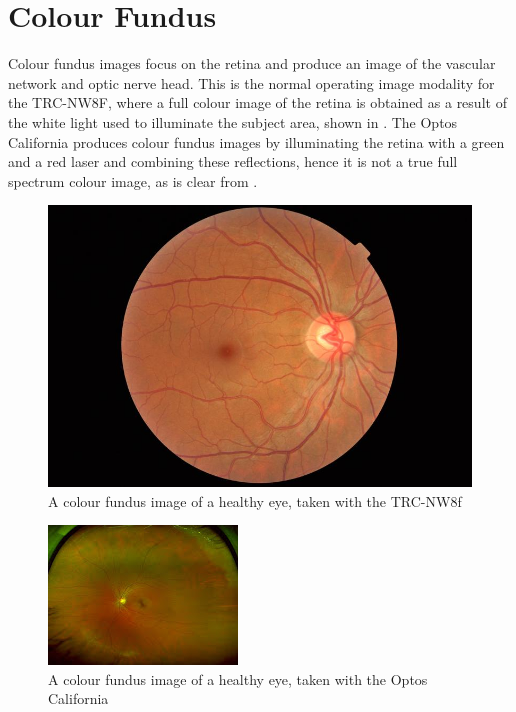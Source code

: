 \section{Colour Fundus}

Colour fundus images focus on the retina and produce an image of the vascular
network and optic nerve head. This is the normal operating image modality for
the TRC-NW8F, where a full colour image of the retina is obtained as a result
of the white light used to illuminate the subject area, shown in .
The Optos California produces colour fundus images by illuminating the retina
with a green and a red laser and combining these reflections, hence it is not
a true full spectrum colour image, as is clear from .

\begin{figure}[htbp]
\centering
\includegraphics{figures/colourtrc}
\caption{A colour fundus image of a healthy eye, taken with the TRC-NW8f}
\label{fig:cf}
   \end{figure}

\begin{figure}[htbp]
\centering
\includegraphics{figures/optoscolour}
\caption{A colour fundus image of a healthy eye, taken with the Optos California}
\label{fig:cfoptos}
   \end{figure}


